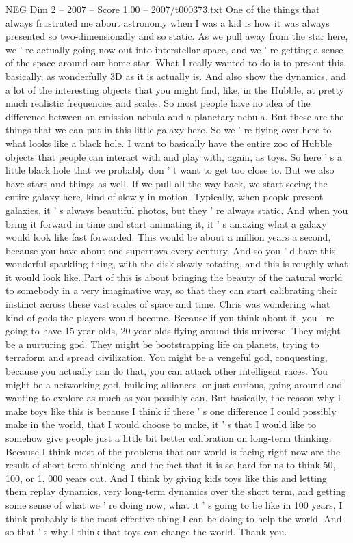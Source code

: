 \begin{textsample}{NEG Dim 2 – 2007 – Score 1.00 – 2007/t000373.txt}
One of the things that always frustrated me about astronomy when I was a kid is how it was always presented so two-dimensionally and so static.
As we pull away from the star here, we ' re actually going now out into interstellar space, and we ' re getting a sense of the space around our home star.
What I really wanted to do is to present this, basically, as wonderfully 3D as it is actually is.
And also show the dynamics, and a lot of the interesting objects that you might find, like, in the Hubble, at pretty much realistic frequencies and scales.
So most people have no idea of the difference between an emission nebula and a planetary nebula.
But these are the things that we can put in this little galaxy here.
So we ' re flying over here to what looks like a black hole.
I want to basically have the entire zoo of Hubble objects that people can interact with and play with, again, as toys.
So here ' s a little black hole that we probably don ' t want to get too close to.
But we also have stars and things as well.
If we pull all the way back, we start seeing the entire galaxy here, kind of slowly in motion.
Typically, when people present galaxies, it ' s always beautiful photos, but they ' re always static.
And when you bring it forward in time and start animating it, it ' s amazing what a galaxy would look like fast forwarded.
This would be about a million years a second, because you have about one supernova every century.
And so you ' d have this wonderful sparkling thing, with the disk slowly rotating, and this is roughly what it would look like.
Part of this is about bringing the beauty of the natural world to somebody in a very imaginative way, so that they can start calibrating their instinct across these vast scales of space and time.
Chris was wondering what kind of gods the players would become.
Because if you think about it, you ' re going to have 15-year-olds, 20-year-olds flying around this universe.
They might be a nurturing god.
They might be bootstrapping life on planets, trying to terraform and spread civilization.
You might be a vengeful god, conquesting, because you actually can do that, you can attack other intelligent races.
You might be a networking god, building alliances, or just curious, going around and wanting to explore as much as you possibly can.
But basically, the reason why I make toys like this is because I think if there ' s one difference I could possibly make in the world, that I would choose to make, it ' s that I would like to somehow give people just a little bit better calibration on long-term thinking.
Because I think most of the problems that our world is facing right now are the result of short-term thinking, and the fact that it is so hard for us to think 50, 100, or 1, 000 years out.
And I think by giving kids toys like this and letting them replay dynamics, very long-term dynamics over the short term, and getting some sense of what we ' re doing now, what it ' s going to be like in 100 years, I think probably is the most effective thing I can be doing to help the world.
And so that ' s why I think that toys can change the world.
Thank you.

\end{textsample}
